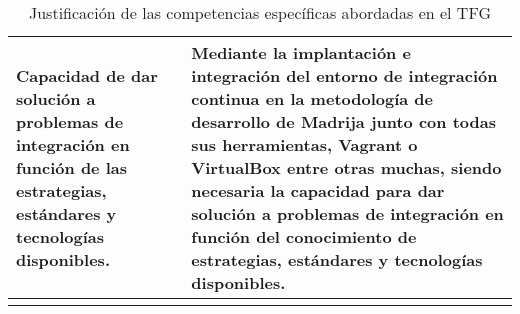 \begin{center}
\begin{longtable}{p{} p{}}
    \hline \hline
    Capacidad de dar solución a problemas de integración en función de las estrategias, estándares y tecnologías disponibles. & Mediante la implantación e integración del entorno de integración continua en la metodología de desarrollo de \ac{Madrija} junto con todas sus herramientas, Vagrant o VirtualBox entre otras muchas, siendo necesaria la capacidad para dar solución a problemas de integración en función del conocimiento de estrategias, estándares y tecnologías disponibles.\\
    \hline \hline
    \caption{Justificación de las competencias específicas abordadas en el TFG}
\end{longtable}
\end{center}